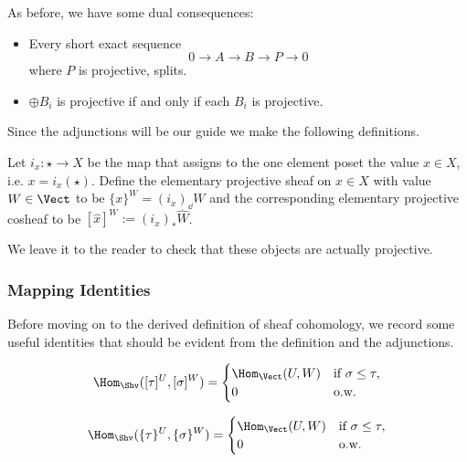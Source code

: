 As before, we have some dual consequences:
\begin{itemize}
 \item Every short exact sequence \[0\to A \to B \to P \to 0\] where $P$ is projective, splits.
 \item $\oplus B_i$ is projective if and only if each $B_i$ is projective.
\end{itemize}

Since the adjunctions will be our guide we make the following definitions.

\begin{defn}
 Let $i_x:\star \to X$ be the map that assigns to the one element poset the value $x\in X$, i.e. $x=i_x(\star)$. Define the elementary projective sheaf on $x\in X$ with value $W\in\Vect$ to be  $\{x\}^W=(i_x)_{\dd}W$ and the corresponding elementary projective cosheaf to be $[\hat{x}]^W:=(i_x)_{*}\hat{W}$. 
\end{defn}

We leave it to the reader to check that these objects are actually projective.

\subsubsection{Mapping Identities}

Before moving on to the derived definition of sheaf cohomology, we record some useful identities that should be evident from the definition and the adjunctions.

\begin{equation*}
 \Hom_{\Shv}([\tau]^U,[\sigma]^W)=
\begin{cases}
 \Hom_{\Vect}(U,W) & \text{if } \sigma \leq \tau, \\
0 & \text{o.w.}
\end{cases}
\end{equation*}

\begin{equation*}
 \Hom_{\Shv}(\{\tau\}^U,\{\sigma\}^W)=
\begin{cases}
 \Hom_{\Vect}(U,W) & \text{if } \sigma \leq \tau, \\
0 & \text{o.w.}
\end{cases}
\end{equation*}

